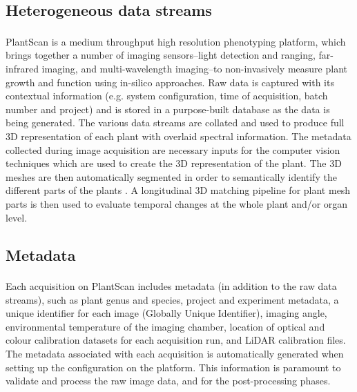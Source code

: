 \documentclass{llncs}
\begin{document}
\subsection{Heterogeneous data streams}

PlantScan\textsuperscript{\texttrademark} is a medium throughput high resolution
phenotyping platform, which brings together a number of imaging sensors--light 
detection and ranging, far-infrared imaging, and multi-wavelength imaging--to non-invasively measure plant growth and function using in-silico approaches.
Raw data is captured with
its contextual information (e.g. system configuration, time of acquisition,
batch number and project) and is stored in a purpose-built database as the data
is being generated. The various data streams are collated and used to produce
full 3D representation of each plant with overlaid spectral information. The
metadata collected during image acquisition are necessary inputs for the
computer vision techniques which are used to create the 3D representation of the
plant.
The 3D meshes are then automatically segmented in order to
semantically identify the different parts of the plants \cite{Paproki2012}. A
longitudinal 3D matching pipeline for plant mesh parts is then used to evaluate 
temporal changes at the whole plant and/or organ level. 


\subsection{Metadata}
Each acquisition on PlantScan\textsuperscript{\texttrademark} includes metadata
(in addition to the raw data
streams), such as plant genus and species, project and experiment metadata, a
unique identifier for each image (Globally Unique Identifier), imaging angle,
environmental temperature of the imaging chamber, location of optical and colour
calibration datasets for each acquisition run, and LiDAR calibration files. The metadata associated with each
acquisition is automatically generated when setting up the configuration on the
platform. This information is paramount to validate and process the raw image
data, and for the post-processing phases. 
\end{document}

